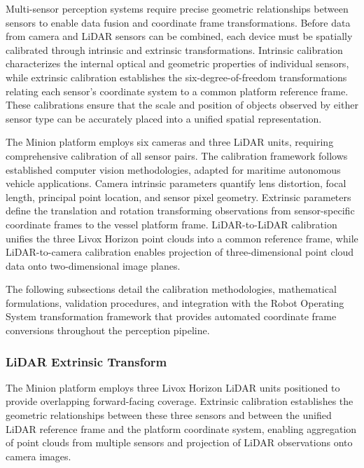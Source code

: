 \documentclass{erauthesis}
\begin{document}
Multi-sensor perception systems require precise geometric relationships between sensors to enable data fusion and coordinate frame transformations.
Before data from camera and LiDAR sensors can be combined, each device must be spatially calibrated through intrinsic and extrinsic transformations.
Intrinsic calibration characterizes the internal optical and geometric properties of individual sensors, while extrinsic calibration establishes the six-degree-of-freedom transformations relating each sensor's coordinate system to a common platform reference frame.
These calibrations ensure that the scale and position of objects observed by either sensor type can be accurately placed into a unified spatial representation.

The Minion platform employs six cameras and three LiDAR units, requiring comprehensive calibration of all sensor pairs.
The calibration framework follows established computer vision methodologies, adapted for maritime autonomous vehicle applications.
Camera intrinsic parameters quantify lens distortion, focal length, principal point location, and sensor pixel geometry.
Extrinsic parameters define the translation and rotation transforming observations from sensor-specific coordinate frames to the vessel platform frame.
LiDAR-to-LiDAR calibration unifies the three Livox Horizon point clouds into a common reference frame, while LiDAR-to-camera calibration enables projection of three-dimensional point cloud data onto two-dimensional image planes.

The following subsections detail the calibration methodologies, mathematical formulations, validation procedures, and integration with the Robot Operating System transformation framework that provides automated coordinate frame conversions throughout the perception pipeline.

\subsubsection{LiDAR Extrinsic Transform} \label{lidar_extrinsic}


The Minion platform employs three Livox Horizon LiDAR units positioned to provide overlapping forward-facing coverage.
Extrinsic calibration establishes the geometric relationships between these three sensors and between the unified LiDAR reference frame and the platform coordinate system, enabling aggregation of point clouds from multiple sensors and projection of LiDAR observations onto camera images.
\end{document}
